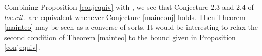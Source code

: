    


\begin{remark}   Combining Proposition \ref{conjequiv} with  \cite[Proposition 2.5]{Miller}, we see that Conjecture 2.3 and 2.4 of \emph{loc.cit.}\ are equivalent whenever Conjecture \ref{mainconj} holds. Then  Theorem \ref{mainteo} may  be seen as a converse of sorts.  It would be interesting to relax the second condition of Theorem \ref{mainteo} to the  bound given in Proposition \ref{conjequiv}. 
\end{remark}  

